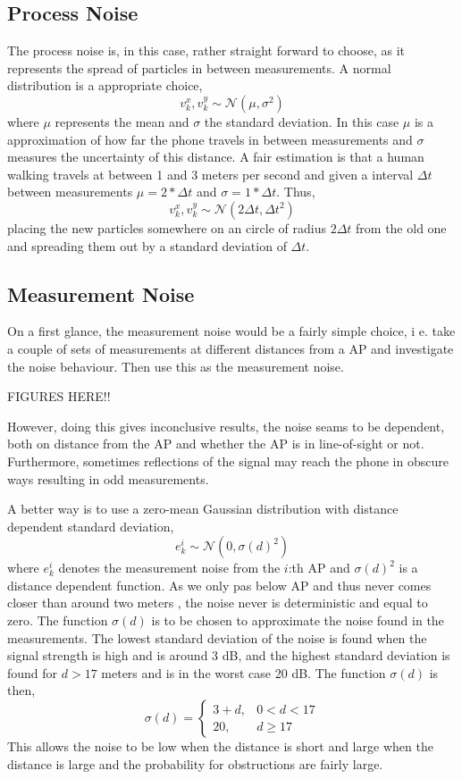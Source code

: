 \documentclass{LTHthesis}
\begin{document}
\subsection{Process Noise}
%
The process noise is, in this case, rather straight forward to choose, as it represents the spread of particles in between measurements. A normal distribution is a appropriate choice,
%
\begin{equation}
v^x_k,v^y_k\sim \mathcal{N}(\mu,\sigma^2)
\end{equation}
%
where $\mu$ represents the mean and $\sigma$ the standard deviation. In this case $\mu$ is a approximation of how far the phone travels in between measurements and $\sigma$ measures the uncertainty of this distance. A fair estimation is that a human walking travels at between 1 and 3 meters per second and given a interval $\Delta t$ between measurements $\mu = 2*\Delta t$ and $\sigma = 1*\Delta t$. Thus,
%
\begin{equation}
v^x_k,v^y_k\sim \mathcal{N}(2\Delta t, \Delta t^2)
\end{equation}
placing the new particles somewhere on an circle of radius $2\Delta t$ from the old one and spreading them out by a standard deviation of $\Delta t$.    
%
\subsection{Measurement Noise}
%
On a first glance, the measurement noise would be a fairly simple choice, i e. take a couple of sets of measurements at different distances from a AP and investigate the noise behaviour. Then use this as the measurement noise. 

FIGURES HERE!!

However, doing this gives inconclusive results, the noise seams to be dependent, both on distance from the AP and whether the AP is in line-of-sight or not. Furthermore, sometimes reflections of the signal may reach the phone in obscure ways resulting in odd measurements.

A better way is to use a zero-mean Gaussian distribution with distance dependent standard deviation, 
%
\begin{equation}
e^i_k\sim \mathcal{N}(0,\sigma(d)^2)
\end{equation}
%
where $e^i_k$ denotes the measurement noise from the $i$:th AP and $\sigma(d)^2$ is a distance dependent function. As we only pas below AP and thus never comes closer than around two meters , the noise never is deterministic and equal to zero. The function $\sigma(d)$ is to be chosen to approximate the noise found in the measurements. The lowest  standard deviation of the noise is found when the signal strength is high and is around 3 dB, and the highest standard deviation is found for $d>17$ meters and is in the worst case 20 dB. The function $\sigma(d)$ is then,
%
\begin{equation}
\sigma(d) = \left \{ \begin{array}{cc}3 + d, & 0<d<17\\ 20,  & d\geq 17\end{array}\right.
\end{equation}
%
This allows the noise to be low when the distance is short and large when the distance is large and the probability for obstructions are fairly large.
%
\end{document}
